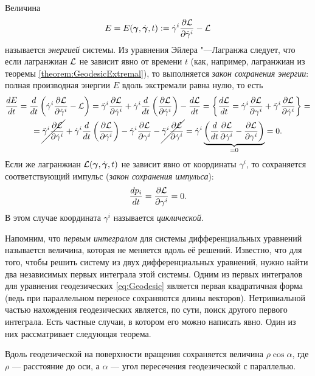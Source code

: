 \noindent
Величина
\[
	E = E(\boldsymbol{\gamma}, \dot{\boldsymbol{\gamma}}, t) \vcentcolon = \dot{\gamma}^i\frac{\partial\mathcal{L}}{\partial\dot{\gamma}^i} - \mathcal{L}
\]
называется \textit{энергией} системы. Из уравнения Эйлера "---Лагранжа следует, что если лагранжиан $\mathcal{L}$ не зависит явно от времени $t$ (как, например, лагранжиан из теоремы \ref{theorem:GeodesicExtremal}), то выполняется \textit{закон сохранения энергии}: полная производная энергии $E$ вдоль экстремали равна нулю, то есть
\begin{multline*}
	\frac{dE}{dt} = \frac{d}{dt}\left(\dot{\gamma}^i\frac{\partial\mathcal{L}}{\partial\dot{\gamma}^i} - \mathcal{L}\right) = \ddot{\gamma}^i\frac{\partial\mathcal{L}}{\partial\dot{\gamma}^i} + \dot{\gamma}^i\frac{d}{dt}\left(\frac{\partial\mathcal{L}}{\partial\dot{\gamma}^i}\right) - \frac{d\mathcal{L}}{dt} = \left\{\frac{d\mathcal{L}}{dt} = \dot{\gamma}^i\frac{\partial\mathcal{L}}{\partial\gamma^i} + \ddot{\gamma}^i\frac{\partial\mathcal{L}}{\partial\dot{\gamma}^i}\right\} =\\ = \cancel{\ddot{\gamma}^i\frac{\partial\mathcal{L}}{\partial\dot{\gamma}^i}} + \dot{\gamma}^i\frac{d}{dt}\left(\frac{\partial\mathcal{L}}{\partial\dot{\gamma}^i}\right) - \dot{\gamma}^i\frac{\partial\mathcal{L}}{\partial\gamma^i} - \cancel{\ddot{\gamma}^i\frac{\partial\mathcal{L}}{\partial\dot{\gamma}^i}} = \dot{\gamma}^i\underbrace{\left(\frac{d}{dt}\frac{\partial\mathcal{L}}{\partial\dot{\gamma}^i} - \frac{\partial\mathcal{L}}{\partial\gamma^i}\right)}_{{} = 0} = 0.
\end{multline*}
Если же лагранжиан $\mathcal{L}(\boldsymbol{\gamma}, \dot{\boldsymbol{\gamma}}, t)$ не зависит явно от координаты $\gamma^i$, то сохраняется соответствующий импульс (\textit{закон сохранения импульса}):
\[
	\frac{dp_i}{dt} = \frac{\partial\mathcal{L}}{\partial\gamma^i} = 0.
\]
В этом случае координата $\gamma^i$ называется \textit{циклической}.

Напомним, что \textit{первым интегралом} для системы дифференциальных уравнений называется величина, которая не меняется вдоль её решений. Известно, что для того, чтобы решить систему из двух дифференциальных уравнений, нужно найти два независимых первых интеграла этой системы. Одним из первых интегралов для уравнения геодезических \eqref{eq:Geodesic} является первая квадратичная форма (ведь при параллельном переносе сохраняются длины векторов). Нетривиальной частью нахождения геодезических является, по сути, поиск другого первого интеграла. Есть частные случаи, в котором его можно написать явно. Один из них рассматривает следующая теорема.

\begin{theorem}[Клеро] \label{theorem:Clairaut}
	Вдоль геодезической на поверхности вращения сохраняется величина $\rho\cos\alpha$, где $\rho$ --- расстояние до оси, а $\alpha$ --- угол пересечения геодезической с параллелью.
\end{theorem}

